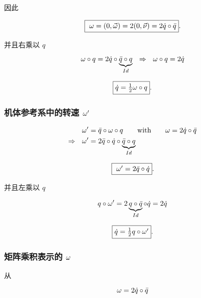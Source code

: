 因此


\begin{equation}
\fbox{ $\omega = (0,\vec{\omega}) = 2(0,\vec{\nu}) = 2 \dot{q} \circ \bar{q} $}.
\end{equation}

并且右乘以 $q$

\begin{equation*}
\omega \circ q= 2 \dot{q} \circ \underbrace{\bar{q} \circ q}_{Id} \ \  \Rightarrow \ \  \omega \circ q = 2 \dot{q}
\end{equation*}

\begin{equation}
\fbox{$ \dot{q} = \frac{1}{2} \omega \circ q $}.
\end{equation}




\subsubsection{机体参考系中的转速 $\omega'$}

\begin{align*}
             \omega'      & = \bar{q} \circ \omega \circ q    \qquad \textrm{with} \qquad    \omega = 2 \dot{q} \circ \bar{q} \\
\Rightarrow  \ \ \omega'  & = 2 \bar{q} \circ \dot{q} \circ \underbrace{\bar{q} \circ q}_{Id}
\end{align*}

\begin{equation}
\fbox{ $\omega' = 2 \bar{q} \circ \dot{q} $}.
\end{equation}

并且左乘以 $q$

\begin{equation*}
q \circ \omega' = 2 \underbrace{q \circ \bar{q}}_{Id} \circ \dot{q} = 2 \dot{q}
\end{equation*}

\begin{equation}
\fbox{$ \dot{q} = \frac{1}{2} q \circ \omega' $}.
\end{equation}




\subsubsection{矩阵乘积表示的 $\omega$}
\label{secMat1}

从

\begin{equation*}
\omega = 2 \dot{q} \circ \bar{q} 
\end{equation*}

